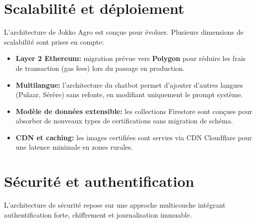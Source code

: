 \documentclass[12pt,a4paper]{report}
\begin{document}
\section{Scalabilité et déploiement}

\noindent
L'architecture de Jokko Agro est conçue pour évoluer. Plusieurs dimensions de
scalabilité sont prises en compte:

\vspace{0.1cm}

\begin{tcolorbox}[infobox,title={Perspectives de scalabilité}]
  \begin{itemize}[itemsep=5pt]
    \item \textbf{Layer 2 Ethereum:} migration prévue vers \textbf{Polygon} pour
          réduire les frais de transaction (gas fees) lors du passage en production.
    \item \textbf{Multilangue:} l'architecture du chatbot permet d'ajouter d'autres
          langues (Pulaar, Sérère) sans refonte, en modifiant uniquement le prompt système.
    \item \textbf{Modèle de données extensible:} les collections Firestore sont conçues
          pour absorber de nouveaux types de certifications sans migration de schéma.
    \item \textbf{CDN et caching:} les images certifiées sont servies via CDN Cloudflare
          pour une latence minimale en zones rurales.
  \end{itemize}
\end{tcolorbox}

\vspace{0.3cm}

\section{Sécurité et authentification}

\noindent
L'architecture de sécurité repose sur une approche multicouche intégrant authentification
forte, chiffrement et journalisation immuable.

\vspace{0.3cm}
\end{document}
